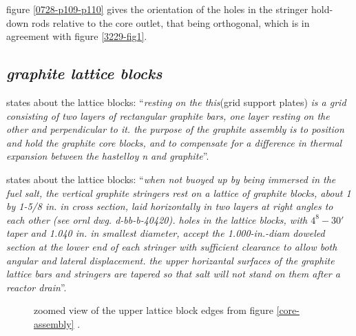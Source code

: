 \documentclass[ms,a4paper]{memoir}
\newcommand*{\mrsarchive}{../../msr-archive}%
\begin{document}
figure \ref{0728-p109-p110} gives the orientation of the holes in the stringer hold-down rods relative to the core outlet, that being orthogonal, which is in agreement with figure \ref{3229-fig1}.


\subsection{\emph{graphite lattice blocks}}
\parencite[page 20]{ornl-tm-3229} states about the lattice blocks: \enquote{\textit{resting on the this}(grid support plates)\textit{ is a grid consisting of two layers of rectangular graphite bars, one layer resting on the other and perpendicular to it. the purpose of the graphite assembly is to position and hold the graphite core blocks, and to compensate for a difference in thermal expansion between the hastelloy n and graphite}}.

\parencite[page 79 and 81]{ornl-tm-0728} states about the lattice blocks: \enquote{\textit{when not buoyed up by being immersed in the fuel salt, the vertical graphite stringers rest on a lattice of graphite blocks, about 1 by 1-5/8 in. in cross section, laid horizontally in two layers at right angles to each other (see ornl dwg. d-bb-b-40420). holes in the lattice blocks, with $4^8-30'$ taper and 1.040 in. in smallest diameter, accept the 1.000-in.-diam doweled section at the lower end of each stringer with sufficient clearance to allow both angular and lateral displacement. the upper horizantal surfaces of the graphite lattice bars and stringers are tapered so that salt will not stand on them after a reactor drain}}.

\begin{figure}[H]
  \centering
  \caption{zoomed view of the upper lattice block edges from figure \ref{core-assembly} \parencite{ornl}.}
  \label{core-assembly-zoom}
\end{figure}

\end{document}
